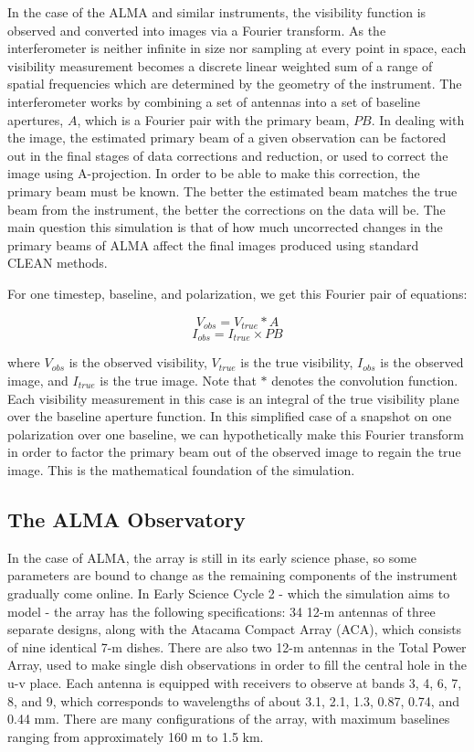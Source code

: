 \documentclass[11pt]{article}
\begin{document}
In the case of the ALMA and similar instruments, the visibility function is 
observed and converted into images
via a Fourier transform. As the interferometer is neither infinite in size nor 
sampling at every point in space, each visibility measurement becomes a 
discrete linear weighted sum of a range of spatial frequencies which are 
determined by the geometry of the instrument. The interferometer works by 
combining a set of
antennas into a set of baseline apertures, $A$, which is a Fourier pair with
the primary beam, $PB$. In dealing with the image, the estimated
primary beam of a given observation can be factored out in the final stages of
data corrections and reduction, or used to correct the image using 
A-projection.  In order to be able to make this correction, the primary beam 
must be known.
The better the estimated beam matches the true beam from the instrument,
the better the corrections on the data will be. The main question this 
simulation is that of how much uncorrected changes in the primary beams of ALMA 
affect the final images produced using standard CLEAN methods.

For one timestep, baseline, and polarization, we get this Fourier pair of 
equations:

\begin{equation}
    \label{eq:vis}
    V_{obs} = V_{true} * A
\end{equation}
\begin{equation}
    \label{eq:im}
    I_{obs} = I_{true} \times PB
\end{equation}

where $V_{obs}$ is the observed visibility, $V_{true}$ is the true visibility, 
$I_{obs}$ is the observed image, and $I_{true}$ is the true image. Note that 
$*$ denotes the convolution function. Each visibility measurement in this case 
is an integral of the true visibility plane over the baseline aperture 
function. In this simplified case of a snapshot on one polarization over one 
baseline, we can hypothetically make this Fourier transform in order to factor 
the primary beam out of the observed image to regain the true image. This is 
the mathematical foundation of the simulation.

\subsection{The ALMA Observatory}

In the case of ALMA, the array is still in its early science phase, so some 
parameters are bound to change as the remaining components of the instrument 
gradually come online. In Early Science Cycle 2 - which the simulation aims to 
model - the array has the following specifications: 34 12-m antennas of three 
separate designs, along with the Atacama Compact Array (ACA), which consists of 
nine identical 7-m dishes. There are also two 12-m antennas in the Total Power 
Array, used to make single dish observations in order to fill the central hole 
in the u-v place. Each antenna is equipped with receivers to observe at bands 
3, 4, 6, 7, 8, and 9, which corresponds to wavelengths of about 3.1, 2.1, 1.3, 
0.87, 0.74, and 0.44 mm. There are many configurations of the array, with 
  maximum baselines ranging from approximately 160 m to 1.5 km.
\end{document}
